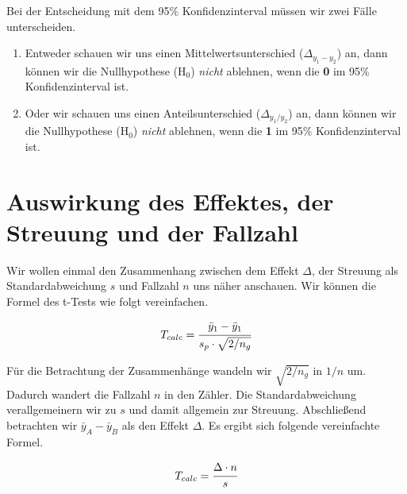 \documentclass[
  letterpaper,
]{scrbook}
\begin{document}
\begin{tcolorbox}[enhanced jigsaw, coltitle=black, titlerule=0mm, bottomrule=.15mm, opacityback=0, opacitybacktitle=0.6, leftrule=.75mm, title=\textcolor{quarto-callout-important-color}{\faExclamation}\hspace{0.5em}{Entscheidung mit dem 95\% Konfidenzintervall}, toprule=.15mm, bottomtitle=1mm, toptitle=1mm, left=2mm, breakable, arc=.35mm, colback=white, rightrule=.15mm, colbacktitle=quarto-callout-important-color!10!white, colframe=quarto-callout-important-color-frame]

Bei der Entscheidung mit dem 95\% Konfidenzinterval müssen wir zwei
Fälle unterscheiden.

\begin{enumerate}
\def\labelenumi{(\arabic{enumi})}
\item
  Entweder schauen wir uns einen Mittelwertsunterschied
  (\(\Delta_{y_1-y_2}\)) an, dann können wir die Nullhypothese (H\(_0\))
  \emph{nicht} ablehnen, wenn die \textbf{0} im 95\% Konfidenzinterval
  ist.
\item
  Oder wir schauen uns einen Anteilsunterschied (\(\Delta_{y_1/y_2}\))
  an, dann können wir die Nullhypothese (H\(_0\)) \emph{nicht} ablehnen,
  wenn die \textbf{1} im 95\% Konfidenzinterval ist.
\end{enumerate}

\end{tcolorbox}

\hypertarget{sec-delta-n-s}{%
\section{Auswirkung des Effektes, der Streuung und der
Fallzahl}\label{sec-delta-n-s}}

Wir wollen einmal den Zusammenhang zwischen dem Effekt \(\Delta\), der
Streuung als Standardabweichung \(s\) und Fallzahl \(n\) uns näher
anschauen. Wir können die Formel des t-Tests wie folgt vereinfachen.

\[
T_{calc}=\cfrac{\bar{y}_1-\bar{y}_1}{s_{p} \cdot \sqrt{2/n_g}}
\]

Für die Betrachtung der Zusammenhänge wandeln wir \(\sqrt{2/n_g}\) in
\(1/n\) um. Dadurch wandert die Fallzahl \(n\) in den Zähler. Die
Standardabweichung verallgemeinern wir zu \(s\) und damit allgemein zur
Streuung. Abschließend betrachten wir \(\bar{y}_A-\bar{y}_B\) als den
Effekt \(\Delta\). Es ergibt sich folgende vereinfachte Formel.

\[
T_{calc} = \cfrac{\Delta \cdot n}{s}
\]
\end{document}
